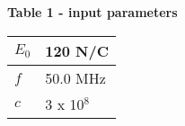 \setlength{\arrayrulewidth}{0.5mm}
\setlength{\tabcolsep}{18pt}
\renewcommand{\arraystretch}{1.5}

\textbf{Table 1 - input parameters}\\

    \begin{tabular}{ |p{2cm}|p{2cm}| }
    \hline
    $E_0$ & 120 N/C\\
    \hline
    $f$ & 50.0 MHz\\
    \hline
    $c$ & 3 x 10$^8$\\
    \hline
    \end{tabular}\\